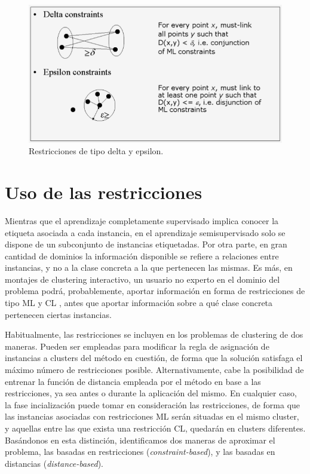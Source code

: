 \begin{figure}[!h]
	\centering
	\includegraphics[scale=0.45]{imagenes/c3/RestriccionesDeltaEpsilo.png} 
	\caption{Restricciones de tipo delta y epsilon. \cite{Survey:2007}}\label{fig:figure4}
\end{figure}


\section{Uso de las restricciones}

Mientras que el aprendizaje completamente supervisado implica conocer la etiqueta asociada a cada instancia, en el aprendizaje semisupervisado solo se dispone de un subconjunto de instancias etiquetadas. Por otra parte, en gran cantidad de dominios la información disponible se refiere a relaciones entre instancias, y no a la clase concreta a la que pertenecen las mismas. Es más, en montajes de clustering interactivo, un usuario no experto en el dominio del problema podrá, probablemente, aportar información en forma de restricciones de tipo \acf{ML} y \acf{CL} \cite{Cohn:2003}\cite{DavidsonRavi:2007}, antes que aportar información sobre a qué clase concreta pertenecen ciertas instancias.

Habitualmente, las restricciones se incluyen en los problemas de clustering de dos maneras. Pueden ser empleadas para modificar la regla de asignación de instancias a clusters del método en cuestión, de forma que la solución satisfaga el máximo número de restricciones posible. Alternativamente, cabe la posibilidad de entrenar la función de distancia empleada por el método en base a las restricciones, ya sea antes o durante la aplicación del mismo. En cualquier caso, la fase incialización puede tomar en consideración las restricciones, de forma que las instancias asociadas con restricciones \acf{ML} serán situadas en el mismo cluster, y aquellas entre las que exista una restricción \acf{CL}, quedarán en clusters diferentes. Basándonos en esta distinción, identificamos dos maneras de aproximar el problema, las basadas en restricciones (\textit{constraint-based}), y las basadas en distancias (\textit{distance-based}).


